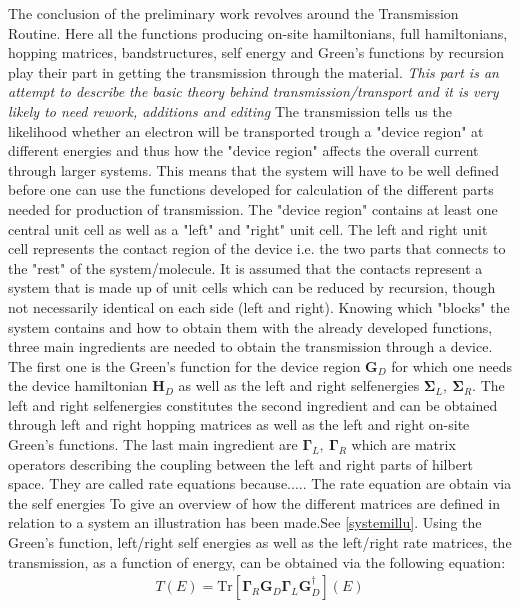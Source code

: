 The conclusion of the preliminary work revolves around the Transmission Routine. Here all the functions producing on-site hamiltonians, full hamiltonians, hopping matrices, bandstructures, self energy and Green's functions by recursion play their part in getting the transmission through the material. \textit{This part is an attempt to describe the basic theory behind transmission/transport and it is very likely to need rework, additions and editing} The transmission tells us the likelihood whether an electron will be transported trough a "device region" at different energies and thus how the "device region" affects the overall current through larger systems. This means that the system will have to be well defined before one can use the functions developed for calculation of the different parts needed for production of transmission. The "device region" contains at least one central unit cell as well as a "left" and "right" unit cell. The left and right unit cell represents the contact region of the device i.e. the two parts that connects to the "rest" of the system/molecule. It is assumed that the contacts represent a system that is made up of unit cells which can be reduced by recursion, though not necessarily identical on each side (left and right). Knowing which "blocks" the system contains and how to obtain them with the already developed functions, three main ingredients are needed to obtain the transmission through a device. The first one is the Green's function for the device region \(\mathbf{G}_D\) for which one needs the device hamiltonian \(\mathbf{H}_D\) as well as the left and right selfenergies \(\mathbf{\Sigma}_L, \ \mathbf{\Sigma}_R\). The left and right selfenergies constitutes the second ingredient and can be obtained through left and right hopping matrices as well as the left and right on-site Green's functions. The last main ingredient are \(\mathbf{\Gamma}_L,\ \mathbf{\Gamma}_R\) which are matrix operators describing the coupling between the left and right parts of hilbert space. They are called rate equations because..... The rate equation are obtain via the self energies To give an overview of how the different matrices are defined in relation to a system an illustration has been made.See \cref{systemillu}. Using the Green's function, left/right self energies as well as the left/right rate matrices, the transmission, as a function of energy, can be obtained via the following equation:
\begin{align}
    T(E) = \text{Tr}[\mathbf{\Gamma}_R\mathbf{G}_D\mathbf{\Gamma}_L\mathbf{G}_D^{\dagger}](E)
\end{align}
